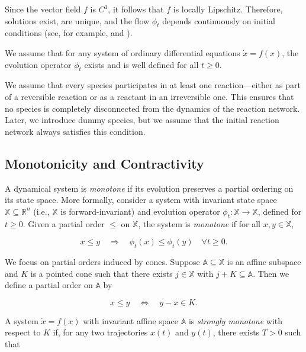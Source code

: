\documentclass{article}
\begin{document}
Since the vector field \( f \) is \( C^1 \), it follows that \( f \) is locally Lipschitz. Therefore, solutions exist, are unique, and the flow \( \phi_t \) depends continuously on initial conditions (see, for example, \cite[Theorem~54]{sontag2013mathematical} and \cite[Theorem~1]{sontag2013mathematical}).

We assume that for any system of ordinary differential equations \( \dot{x} = f(x) \), the evolution operator \( \phi_t \) exists and is well defined for all \( t \geq 0 \).









We assume that every species participates in at least one reaction—either as part of a reversible reaction or as a reactant in an irreversible one. This ensures that no species is completely disconnected from the dynamics of the reaction network. Later, we introduce dummy species, but we assume that the initial reaction network always satisfies this condition.

\subsection{Monotonicity and Contractivity}

A dynamical system is \textit{monotone} if its evolution preserves a partial ordering on its state space. More formally, consider a system with invariant state space $\mathbb{X} \subseteq \mathbb{R}^n$ (i.e., $\mathbb{X}$ is forward-invariant) and evolution operator $\phi_t:\mathbb{X} \to \mathbb{X}$, defined for $t \geq 0$. Given a partial order $\leq$ on $\mathbb{X}$, the system is \textit{monotone} if for all $x, y \in \mathbb{X}$,

\[
x \leq y \quad \Rightarrow \quad \phi_t(x) \leq \phi_t(y) \quad \forall t \geq 0.
\]



We focus on partial orders induced by cones. Suppose $\mathbb{A} \subseteq \mathbb{X}$ is an affine subspace and $K$ is a pointed cone such that there exists $j \in \mathbb{X}$ with $j + K \subseteq \mathbb{A}$. Then we define a partial order on $\mathbb{A}$ by

\[
x \leq y \quad \iff \quad y - x \in K.
\]

A system $\dot{x} = f(x)$ with invariant affine space $\mathbb{A}$ is \textit{strongly monotone} with respect to $K$ if, for any two trajectories $x(t)$ and $y(t)$, there exists $T > 0$ such that
\end{document}
